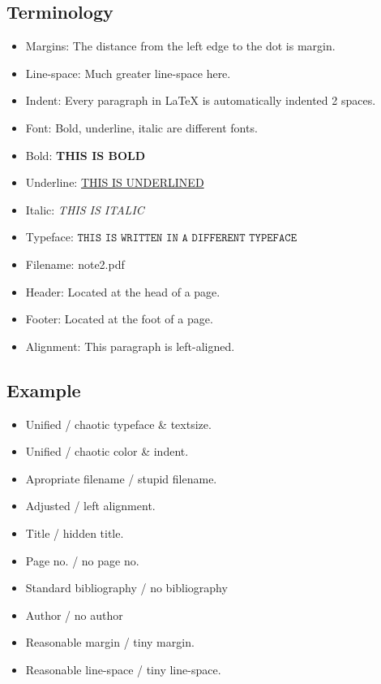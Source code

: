 \documentclass[a4paper]{article}
\begin{document}
\subsection{Terminology}

\begin{itemize}
    \item Margins: The distance from the left edge to the dot is margin.
    \setlength{\itemsep}{15pt}
    \setlength{\parsep}{15pt}
    \setlength{\parskip}{15pt}
    \item Line-space: Much greater line-space here.
    \item Indent: Every paragraph in LaTeX is automatically indented 2 spaces.
    \setlength{\itemsep}{5pt}
    \setlength{\parsep}{5pt}
    \setlength{\parskip}{5pt}
    \item Font: Bold, underline, italic are different fonts.
    \item Bold: \textbf{THIS IS BOLD}
    \item Underline: \underline{THIS IS UNDERLINED}
    \item Italic: \textit{THIS IS ITALIC}
    \item Typeface: $\texttt{THIS IS WRITTEN IN A DIFFERENT TYPEFACE}$
    \item Filename: note2.pdf
    \item Header: Located at the head of a page.
    \item Footer: Located at the foot of a page.
    \item Alignment: This paragraph is left-aligned.
\end{itemize}

\subsection{Example}

\begin{itemize}
    \item Unified / chaotic typeface \& textsize.
    \item Unified / chaotic color \& indent.
    \item Apropriate filename / stupid filename.
    \item Adjusted / left alignment.
    \item Title / hidden title.
    \item Page no. / no page no.
    \item Standard bibliography / no bibliography
    \item Author / no author
    \item Reasonable margin / tiny margin.
    \item Reasonable line-space / tiny line-space.
\end{itemize}
\end{document}
